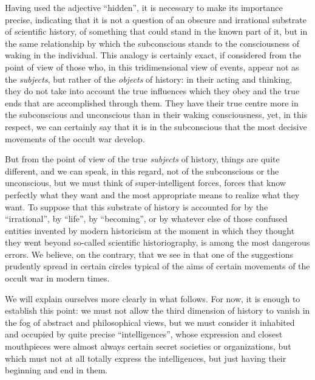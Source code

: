 Having used the adjective ``hidden'', it is necessary to make its importance precise, indicating that it is not a question of an obscure and irrational substrate of scientific history, of something that could stand in the known part of it, but in the same relationship by which the subconscious stands to the consciousness of waking in the individual. This analogy is certainly exact, if considered from the point of view of those who, in this tridimensional view of events, appear not as the
\emph{subjects}, but rather of the \emph{objects} of history: in their acting and thinking, they do not take into account the true influences which they obey and the true ends that are accomplished through them. They have their true centre more in the subconscious and unconscious than in their waking consciousness, yet, in this respect, we can certainly say that it is in the subconscious that the most decisive movements of the occult war develop.

But from the point of view of the true \emph{subjects} of history, things are quite different, and we can speak, in this regard, not of the subconscious or the unconscious, but we must think of super-intelligent forces, forces that know perfectly what they want and the most appropriate means to realize what they want. To suppose that this substrate of history is accounted for by the ``irrational'', by ``life'', by ``becoming'', or by whatever else of those confused entities invented by modern historicism at the moment in which they thought they went beyond so-called scientific historiography, is among the most dangerous errors. We believe, on the contrary, that we see in that one of the suggestions prudently spread in certain circles typical of the aims of certain movements of the occult war in modern times.

We will explain ourselves more clearly in what follows. For now, it is enough to establish this point: we must not allow the third dimension of history to vanish in the fog of abstract and philosophical views, but we must consider it inhabited and occupied by quite precise ``intelligences'', whose expression and closest mouthpieces were almost always certain secret societies or organizations, but which must not at all totally express the intelligences, but just having their beginning and end in them.


